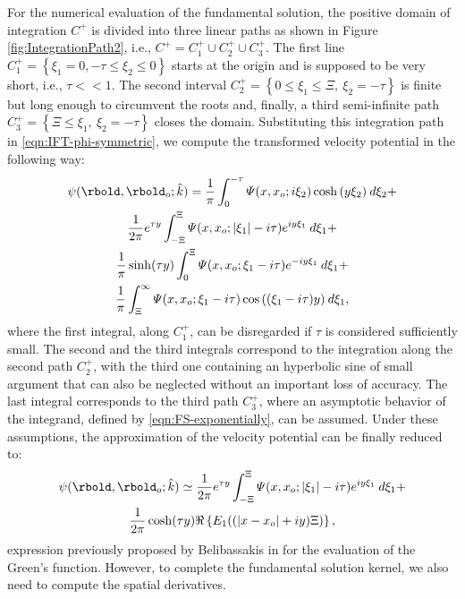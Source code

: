 For the numerical evaluation of the fundamental solution, the positive domain of integration $C^+$ is divided into three linear paths as shown in Figure \ref{fig:IntegrationPath2}, i.e., $C^{+}=C_{1}^{+} \cup C_{2}^{+} \cup C_{3}^{+}$. The first line $C_{1}^{+}= \left\lbrace \xi_{1}=0, -\tau \leq \xi_{2} \leq 0 \right\rbrace$ starts at the origin and is supposed to be very short, i.e., $\tau<<1$. The second interval $C_{2}^{+}= \left\lbrace 0 \leq \xi_{1} \leq \Xi ,\: \xi_{2}=-\tau \right\rbrace$ is finite but long enough to circumvent the roots and, finally, a third semi-infinite path $C_{3}^{+} = \left\lbrace \Xi \leq \xi_{1} ,\: \xi_{2}=-\tau \right\rbrace$ closes the domain.
Substituting this integration path in \eqref{eqn:IFT-phi-symmetric}, we compute the transformed velocity potential in the following way:
\begin{multline}
\label{eqn:IFT-phi-symmetric-NFT1}
\psi(\rbold,\rbold_o; \hat{k}) = 
\dfrac{1}{\pi} \int_{0}^{-\tau} \varPsi (x,x_o;i\xi_{2}) \cosh{(y \xi_{2})} \: d\xi _{2} +\\
\dfrac{1}{2\pi} e^{\tau y} \int_{-\Xi}^{\Xi} \varPsi (x,x_o;|\xi_{1}|-i\tau) e^{i y \xi_{1}} \: d\xi_{1} + \\
\dfrac{1}{\pi} \sinh(\tau y) \int_{0}^{\Xi} \varPsi (x,x_o;\xi_{1}-i\tau) e^{-i y \xi_{1}} \: d\xi_{1} + \\
\dfrac{1}{\pi} \int_{\Xi}^{\infty} \varPsi (x,x_o;\xi_{1}-i\tau) \cos{((\xi_{1}-i\tau)y)} \: d\xi_{1},
\end{multline}
where the first integral, along $C_{1}^{+}$, can be disregarded if $\tau$ is considered sufficiently small. The second and the third integrals correspond to the integration along the second path $C_{2}^{+}$, with the third one containing an hyperbolic sine of small argument that can also be neglected without an important loss of accuracy. The last integral corresponds to the third path $C_{3}^{+}$, where an asymptotic behavior of the integrand, defined by \eqref{eqn:FS-exponentially}, can be assumed. Under these assumptions, the approximation of the velocity potential can be finally reduced to:
%
\begin{multline}
\label{eqn:IFT-phi-symmetric-NFT2}
\psi(\rbold,\rbold_{o}; \hat{k}) \simeq \dfrac{1}{2\pi} e^{\tau y} \int_{-\Xi}^{\Xi} \varPsi (x,x_o;| \xi_{1} | -i\tau) e^{iy \xi_{1}} \:d\xi_{1} + \\
\dfrac{1}{2\pi} \cosh(\tau y) \Re \left\lbrace E_{1}((| x-x_o | +iy)\Xi) \right\rbrace,
\end{multline}
%
expression previously proposed by Belibassakis in \cite{Belibassakis2000} for the evaluation of the Green's function. However, to complete the fundamental solution kernel, we also need to compute the spatial derivatives.


